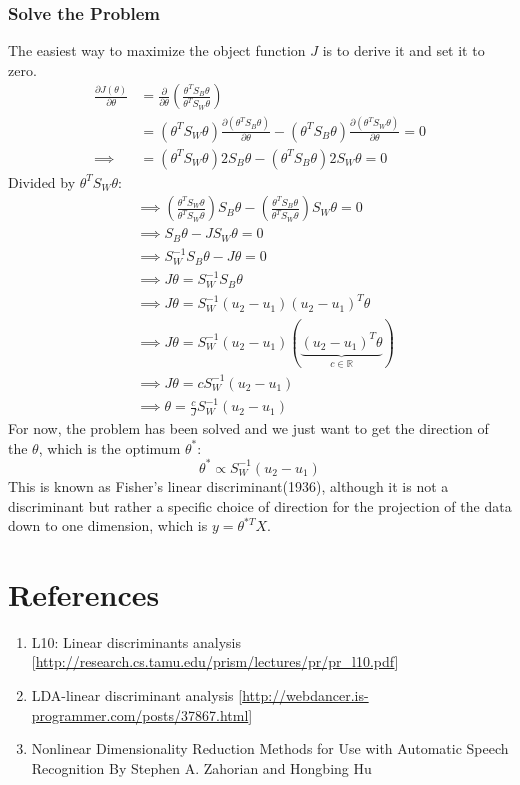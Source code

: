 \documentclass[a4paper]{article}
\begin{document}
\subsubsection{Solve the Problem}
The easiest way to maximize the object function $J$ is to derive it and set it to zero.
\begin{align*}
	\frac {\partial J(\theta)}{\partial \theta} &= \frac {\partial } {\partial \theta} (\frac{\theta^T S_B \theta} {\theta^T S_W \theta}) \\
	&= (\theta^T S_W \theta) \frac{\partial (\theta^T S_B \theta)} {\partial \theta} - (\theta^T S_B \theta) \frac {\partial (\theta^T S_W \theta)} {\partial \theta} = 0 \\
	\implies &= (\theta^T S_W \theta) 2 S_B \theta - (\theta^T S_B \theta) 2 S_W \theta = 0
\end{align*}
Divided by $\theta^T S_W \theta:$ 
\begin{align*}
	&\implies (\frac{\theta^T S_W \theta} {\theta^T S_W \theta})S_B\theta - (\frac{\theta^T S_B \theta} {\theta^T S_W \theta})S_W \theta = 0 \\
	&\implies S_B \theta - J S_W \theta = 0 \\
	&\implies S^{-1}_W S_B \theta - J\theta = 0 \\
	&\implies  J\theta = S^{-1}_W S_B \theta  \\
	&\implies  J\theta = S^{-1}_W (u_2 - u_1)(u_2 - u_1)^T \theta  \\
	&\implies  J\theta = S^{-1}_W (u_2 - u_1) (\underbrace{(u_2 - u_1)^T \theta}_{c \in \mathbb{R}})  \\
	&\implies  J\theta = c S^{-1}_W(u_2 - u_1)   \\
	&\implies \theta = \frac{c}{J} S^{-1}_W(u_2 - u_1)
\end{align*}
For now, the problem has been solved and we just want to get the direction of the $\theta$, which is the optimum $ \theta^\ast$:
$$
	\theta^{\ast}  \propto S^{-1}_W(u_2 - u_1)
$$
This is known as Fisher's linear discriminant(1936), although it is not a discriminant but rather a specific choice of direction for the projection of the data down to one dimension, which is $y = \theta^{\ast T}X$. 


\section{References}
\begin{enumerate}
\item L10: Linear discriminants analysis [\url{http://research.cs.tamu.edu/prism/lectures/pr/pr\_l10.pdf}] 

\item LDA-linear discriminant analysis [\url{http://webdancer.is-programmer.com/posts/37867.html}]

\item Nonlinear Dimensionality Reduction Methods for Use with Automatic Speech Recognition By Stephen A. Zahorian and Hongbing Hu	
\end{enumerate}
\end{document}
